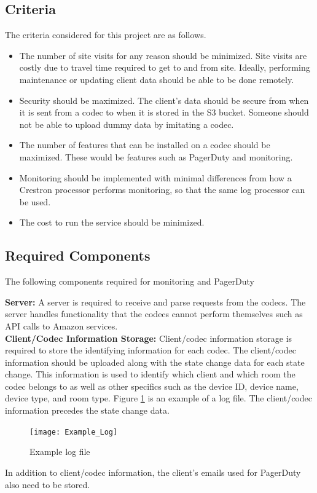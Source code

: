 \documentclass[letterpaper,12pt]{article}
\begin{document}
\subsection{Criteria}
The criteria considered for this project are as follows.
\begin{itemize}
	\item The number of site visits for any reason should be minimized. Site visits are costly due to travel time required to get to and from site. Ideally, performing maintenance or updating client data should be able to be done remotely.
	\item Security should be maximized. The client's data should be secure from when it is sent from a codec to when it is stored in the S3 bucket. Someone should not be able to upload dummy data by imitating a codec.
	\item The number of features that can be installed on a codec should be maximized. These would be features such as PagerDuty and monitoring.
    \item Monitoring should be implemented with minimal differences from how a Crestron processor performs monitoring, so that the same log processor can be used.
    \item The cost to run the service should be minimized.
\end{itemize}

\subsection{Required Components}
The following components required for monitoring and PagerDuty

\textbf{Server:} A server is required to receive and parse requests from the codecs. The server handles functionality that the codecs cannot perform themselves such as API calls to Amazon services.\\

\textbf{Client/Codec Information Storage:} Client/codec information storage is required to store the identifying information for each codec. The client/codec information should be uploaded along with the state change data for each state change. This information is used to identify which client and which room the codec belongs to as well as other specifics such as the device ID, device name, device type, and room type. Figure \ref{fig:examplelog} is an example of a log file. The client/codec information precedes the state change data.
\begin{figure}[H]
\centering \texttt{[image: Example\_Log]}
\caption{\label{fig:examplelog}Example log file}
\end{figure}
In addition to client/codec information, the client's emails used for PagerDuty also need to be stored.
\end{document}
